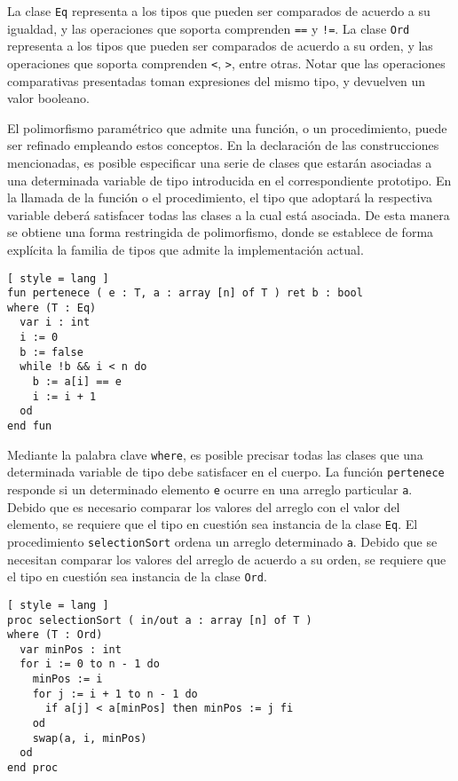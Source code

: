 La clase \lstinline[style = lang]{Eq} representa a los tipos que pueden ser comparados de acuerdo a su igualdad, y las operaciones que soporta comprenden \lstinline[style = lang]{==} y \lstinline[style = lang]{!=}.
La clase \lstinline[style = lang]{Ord} representa a los tipos que pueden ser comparados de acuerdo a su orden, y las operaciones que soporta comprenden \lstinline[style = lang]{<}, \lstinline[style = lang]{>}, entre otras.
Notar que las operaciones comparativas presentadas toman expresiones del mismo tipo, y devuelven un valor booleano.

El polimorfismo paramétrico que admite una función, o un procedimiento, puede ser refinado empleando estos conceptos.
En la declaración de las construcciones mencionadas, es posible especificar una serie de clases que estarán asociadas a una determinada variable de tipo introducida en el correspondiente prototipo.
En la llamada de la función o el procedimiento, el tipo que adoptará la respectiva variable deberá satisfacer todas las clases a la cual está asociada.
De esta manera se obtiene una forma restringida de polimorfismo, donde se establece de forma explícita la familia de tipos que admite la implementación actual.

\begin{lstlisting}[ style = lang ]
fun pertenece ( e : T, a : array [n] of T ) ret b : bool
where (T : Eq)
  var i : int
  i := 0
  b := false
  while !b && i < n do
    b := a[i] == e
    i := i + 1
  od
end fun
\end{lstlisting}

Mediante la palabra clave \lstinline[style = lang]{where}, es posible precisar todas las clases que una determinada variable de tipo debe satisfacer en el cuerpo.
La función \lstinline[style = lang]{pertenece} responde si un determinado elemento \lstinline[style = lang]{e} ocurre en una arreglo particular \lstinline[style = lang]{a}.
Debido que es necesario comparar los valores del arreglo con el valor del elemento, se requiere que el tipo en cuestión sea instancia de la clase \lstinline[style = lang]{Eq}.
El procedimiento \lstinline[style = lang]{selectionSort} ordena un arreglo determinado \lstinline[style = lang]{a}.
Debido que se necesitan comparar los valores del arreglo de acuerdo a su orden, se requiere que el tipo en cuestión sea instancia de la clase \lstinline[style = lang]{Ord}.

\begin{lstlisting}[ style = lang ]
proc selectionSort ( in/out a : array [n] of T )
where (T : Ord)
  var minPos : int
  for i := 0 to n - 1 do
    minPos := i
    for j := i + 1 to n - 1 do
      if a[j] < a[minPos] then minPos := j fi
    od
    swap(a, i, minPos)
  od
end proc
\end{lstlisting}

